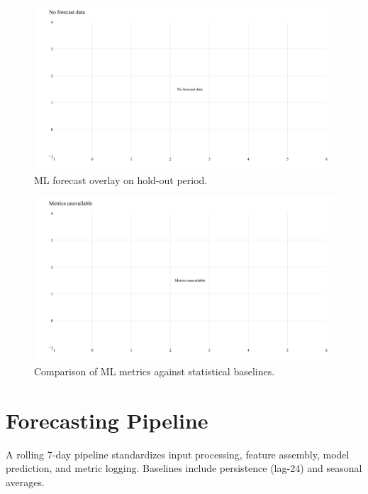 \documentclass[12pt,a4paper]{article}
\begin{document}
\begin{figure}[H]
  \centering
  \includegraphics[width=\linewidth]{ml_forecast_overlay.png}
  \caption{ML forecast overlay on hold-out period.}
  \label{fig:ml_overlay}
\end{figure}

\begin{figure}[H]
  \centering
  \includegraphics[width=\linewidth]{ml_metrics_comparison.png}
  \caption{Comparison of ML metrics against statistical baselines.}
  \label{fig:ml_metrics}
\end{figure}

\section{Forecasting Pipeline}
A rolling 7-day pipeline standardizes input processing, feature assembly, model prediction, and metric logging. Baselines include persistence (lag-24) and seasonal averages.
\end{document}
